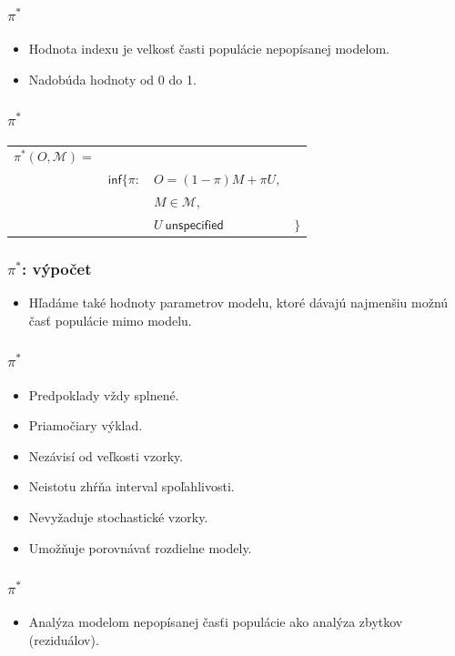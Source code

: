 \documentclass[14pt]{beamer}
\begin{document}
\begin{frame}
	\frametitle{$\pi^*$}
	\begin{itemize}
		\item[] Hodnota indexu je velkos\v{t} \v{c}asti popul\'acie nepop\'isanej modelom.
		\item[]	Nadob\'uda hodnoty od 0 do 1.
	\end{itemize}
\end{frame}


\begin{frame}
	\frametitle{$\pi^*$}
	\begin{tabular}{rrll}
		$\pi^*({O, \mathcal{M}}) = $ & & & \\
		& $\mathsf{inf}\{\pi\colon$ & $ {O}= (1-\pi){M} + \pi{U},$ & \\
		& & $M \in \mathcal{M},$ & \\
		& & ${U} \ \mathsf{unspecified}$ & $\}$ \\
	\end{tabular}
\end{frame}


\begin{frame}
	\frametitle{$\pi^*$: v\'ypo\v{c}et}
	\begin{itemize}
		\item[] H\v{l}ad\'ame tak\'e hodnoty parametrov modelu, ktor\'e 
				d\'avaj\'u najmen\v{s}iu mo\v{z}n\'u \v{c}as\v{t} popul\'acie
				mimo modelu.	
	\end{itemize}
\end{frame}




\begin{frame}
	\frametitle{$\pi^*$}
	\begin{itemize}
		\item 	Predpoklady v\v{z}dy splnen\'e.
		\item	Priamo\v{c}iary v\'yklad.
		\item 	Nez\'avis\'i od ve\v{l}kosti vzorky.
		\item	Neistotu zh\'r\v{n}a interval spo\v{l}ahlivosti.
		\item 	Nevy\v{z}aduje stochastick\'e vzorky.
		\item 	Umo\v{z}\v{n}uje porovn\'ava\v{t} rozdielne modely.
	\end{itemize}
\end{frame}



\begin{frame}
	\frametitle{$\pi^*$}
	\begin{itemize}
		\item[]	Anal\'yza modelom nepop\'isanej \v{c}as\v{t}i popul\'acie
				ako anal\'yza zbytkov (rezidu\'alov).
	\end{itemize}
\end{frame}
\end{document}
